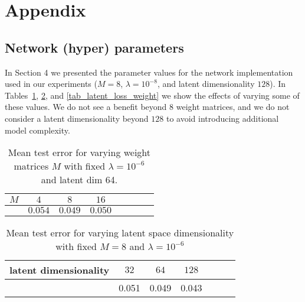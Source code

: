 \appendix
\section{Appendix}
\subsection{Network (hyper) parameters}
In Section 4 we presented the parameter values for the network implementation used in our experiments ($M=8$, $\lambda=10^{-8}$, and latent dimensionality $128$). In Tables~\ref{tab_weight_matrices}, \ref{tab_latent_dim}, and \ref{tab_latent_loss_weight} we show the effects of varying some of these values. We do not see a benefit beyond 8 weight matrices, and we do not consider a latent dimensionality beyond $128$ to avoid introducing additional model complexity.
\begin{table}[htb]
\centering
\small
\begin{tabular}{ l@{\hskip 0.01\textwidth}c@{\hskip 0.01\textwidth}c@{\hskip 0.01\textwidth}c@{\hskip 0.01\textwidth}c@{\hskip 0.01\textwidth}c@{\hskip 0.01\textwidth}c@{\hskip 0.01\textwidth}c  }
    \hline\hline
    $M$ & $4$ 	& $8$ & $16$ \\ \hline    
      	& $0.054$ & $0.049$ & $0.050$ & \\ \hline
  \end{tabular}   
  \vspace{2mm}
\caption{\small Mean test error for varying weight matrices $M$ with fixed $\lambda=10^{-6}$ and latent dim 64.}
\label{tab_weight_matrices}	
\end{table}
\begin{table}[htb]
\centering
\small
\begin{tabular}{ l@{\hskip 0.01\textwidth}c@{\hskip 0.01\textwidth}c@{\hskip 0.01\textwidth}c@{\hskip 0.01\textwidth}c@{\hskip 0.01\textwidth}c@{\hskip 0.01\textwidth}c  }
    \hline\hline
    latent dimensionality & $32$ & $64$ & $128$  \\ \hline    
      	& 0.051 & 0.049 & 0.043 \\ \hline   
  \end{tabular}   
  \vspace{2mm}
\caption{\small Mean test error for varying latent space dimensionality with fixed $M=8$ and $\lambda=10^{-6}$}
\label{tab_latent_dim}	
\end{table}
